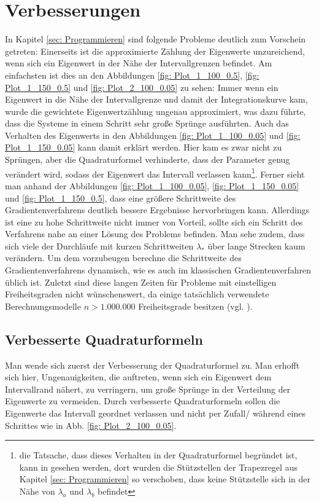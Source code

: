 \documentclass[a4paper,12pt]{report}
\newcommand{\1}{\mathds{1}}
\theoremstyle{plain} %
\theoremstyle{definition} %
\theoremstyle{remark}
\begin{document}
\chapter{Verbesserungen}
\label{sec: Verbesserungen}
      In Kapitel \ref{sec: Programmieren} sind folgende Probleme deutlich zum Vorschein getreten:
      Einerseits ist die approximierte Zählung der Eigenwerte unzureichend, wenn sich ein Eigenwert in der Nähe der Intervallgrenzen befindet.
      Am einfachsten ist dies an den Abbildungen \ref{fig: Plot_1_100_0.5}, \ref{fig: Plot_1_150_0.5} und \ref{fig: Plot_2_100_0.05} zu sehen:
      Immer wenn ein Eigenwert in die Nähe der Intervallgrenze und damit der Integrationskurve kam,
      wurde die gewichtete Eigenwertzählung ungenau approximiert, was dazu führte, dass die Systeme in einem Schritt sehr große Sprünge ausführten.
      Auch das Verhalten des Eigenwerts in den Abbildungen \ref{fig: Plot_1_100_0.05} und \ref{fig: Plot_1_150_0.05} kann damit erklärt werden.
      Hier kam es zwar nicht zu Sprüngen, aber die Quadraturformel verhinderte, dass der Parameter \s genug verändert wird,
      sodass der Eigenwert das Intervall verlassen kann\footnote{die Tatsache, dass dieses Verhalten in der Quadraturformel begründet ist,
      kann in \mbox{\cite[\textit{./Verbesserung\_Trapez.py}]{github}} gesehen werden, dort wurden die Stützstellen der Trapezregel aus Kapitel \ref{sec: Programmieren} so verschoben, dass keine Stützstelle sich in der Nähe von $\lambda_a$ und $\lambda_b$ befindet}.
      Ferner sieht man anhand der Abbildungen \ref{fig: Plot_1_100_0.05}, \ref{fig: Plot_1_150_0.05} und \ref{fig: Plot_1_150_0.5},
      dass eine größere Schrittweite des Gradientenverfahrens deutlich bessere Ergebnisse hervorbringen kann.
      Allerdings ist eine zu hohe Schrittweite nicht immer von Vorteil, sollte sich ein Schritt des Verfahrens nahe an einer Lösung des Problems befinden.
      Man sehe zudem, dass sich viele der Durchläufe mit kurzen Schrittweiten $\lambda_*$ über lange Strecken kaum verändern.
      Um dem vorzubeugen berechne die Schrittweite des Gradientenverfahrens dynamisch, wie es auch im klassischen Gradientenverfahren \cite[S. 285 f.]{optimierungBurkhard} üblich ist.
      Zuletzt sind diese langen Zeiten für Probleme mit einstelligen Freiheitsgraden nicht wünschenswert,
      da einige tatsächlich verwendete Berechnungsmodelle $n>1.000.000$ Freiheitsgrade besitzen (vgl. \cite[S. 359]{maschinendynamikDresig}).

      \section{Verbesserte Quadraturformeln}
            Man wende sich zuerst der Verbesserung der Quadraturformel zu.
            Man erhofft sich hier, Ungenauigkeiten, die auftreten, wenn sich ein Eigenwert dem Intervallrand nähert, zu verringern, um große Sprünge in der Verteilung der Eigenwerte zu vermeiden.
            Durch verbesserte Quadraturformeln sollen die Eigenwerte das Intervall geordnet verlassen und nicht per Zufall/ während eines Schrittes wie in Abb. \ref{fig: Plot_2_100_0.05}.
\end{document}
